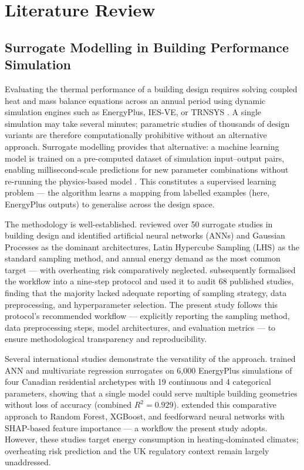 \documentclass[12pt,a4paper]{report}
\begin{document}
\chapter{Literature Review}
\label{ch:litreview}

\section{Surrogate Modelling in Building Performance Simulation}
\label{sec:surrogate-modelling}

Evaluating the thermal performance of a building design requires solving coupled heat and mass balance equations across an annual period using dynamic simulation engines such as EnergyPlus, IES-VE, or TRNSYS \citep{Shatat2015}. A single simulation may take several minutes; parametric studies of thousands of design variants are therefore computationally prohibitive without an alternative approach. Surrogate modelling provides that alternative: a machine learning model is trained on a pre-computed dataset of simulation input--output pairs, enabling millisecond-scale predictions for new parameter combinations without re-running the physics-based model \citep{Westermann2019}. This constitutes a supervised learning problem --- the algorithm learns a mapping from labelled examples (here, EnergyPlus outputs) to generalise across the design space.

The methodology is well-established. \citet{Westermann2019} reviewed over 50 surrogate studies in building design and identified artificial neural networks (ANNs) and Gaussian Processes as the dominant architectures, Latin Hypercube Sampling (LHS) as the standard sampling method, and annual energy demand as the most common target --- with overheating risk comparatively neglected. \citet{Hou2024} subsequently formalised the workflow into a nine-step protocol and used it to audit 68 published studies, finding that the majority lacked adequate reporting of sampling strategy, data preprocessing, and hyperparameter selection. The present study follows this protocol's recommended workflow --- explicitly reporting the sampling method, data preprocessing steps, model architectures, and evaluation metrics --- to ensure methodological transparency and reproducibility.

Several international studies demonstrate the versatility of the approach. \citet{Lawrence2021} trained ANN and multivariate regression surrogates on 6{,}000 EnergyPlus simulations of four Canadian residential archetypes with 19 continuous and 4 categorical parameters, showing that a single model could serve multiple building geometries without loss of accuracy (combined $R^2 = 0.929$). \citet{BagheriEsfeh2025} extended this comparative approach to Random Forest, XGBoost, and feedforward neural networks with SHAP-based feature importance --- a workflow the present study adopts. However, these studies target energy consumption in heating-dominated climates; overheating risk prediction and the UK regulatory context remain largely unaddressed.
\end{document}
